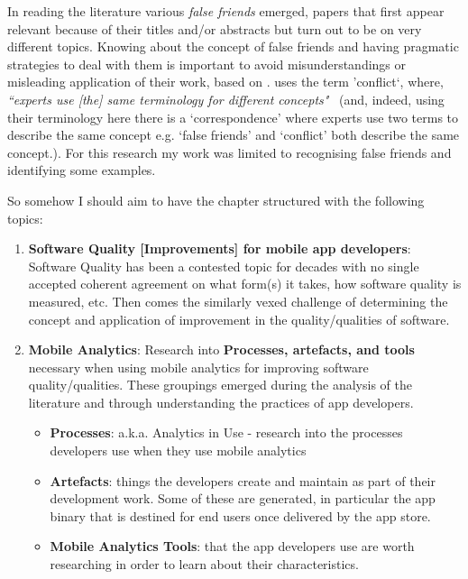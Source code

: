 In reading the literature various \textit{false friends} emerged, papers that first appear relevant because of their titles and/or abstracts but turn out to be on very different topics. 
Knowing about the concept of false friends and having pragmatic strategies to deal with them is important to avoid misunderstandings or misleading application of their work, 
based on \citep[p. 1833]{chamizodominguez2002_false_friends_their_origins_and_semantics_in_some_languages}. 
\citet{shaw1989_comparing_conceptual_structures__consensus_conflict_correspondence_and_contrast} uses the term 'conflict`, where, \emph{``experts use [the] same terminology for different concepts"}~\citep[p. 3]{shaw1989_comparing_conceptual_structures__consensus_conflict_correspondence_and_contrast} (and, indeed, using their terminology here there is a `correspondence' where experts use two terms to describe the same concept e.g. `false friends' and `conflict' both describe the same concept.). For this research my work was limited to recognising false friends and identifying some examples. 

So somehow I should aim to have the chapter structured with the following topics:
\begin{enumerate}
    \item \textbf{Software Quality [Improvements] for mobile app developers}: Software Quality has been a contested topic for decades with no single accepted coherent agreement on what form(s) it takes, how software quality is measured, etc. Then comes the similarly vexed challenge of determining the concept and application of improvement in the quality/qualities of software. 
    \item \textbf{Mobile Analytics}: Research into \textbf{Processes, artefacts, and tools} necessary when using mobile analytics for improving software quality/qualities. These groupings emerged during the analysis of the literature and through understanding the practices of app developers.
    \begin{itemize}
        \item \textbf{Processes}: a.k.a. Analytics in Use - research into the processes developers use when they use mobile analytics
        \item \textbf{Artefacts}: things the developers create and maintain as part of their development work. Some of these are generated, in particular the app binary that is destined for end users once delivered by the app store.
        \item \textbf{Mobile Analytics Tools}: that the app developers use are worth researching in order to learn about their characteristics.
    \end{itemize}
\end{enumerate}

